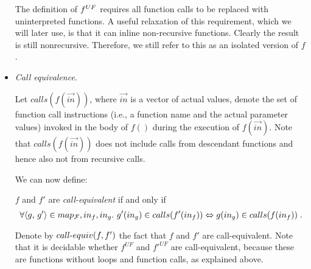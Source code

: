 \begin{itemize}
The definition of ${f}^{UF}$ requires all function calls to be replaced
with uninterpreted functions. A useful relaxation of this requirement,
which we will later use, is that it can inline non-recursive functions.
Clearly the result is still nonrecursive. Therefore, we still refer to this
as an isolated version of $f$.


\item \emph{Call equivalence}.
%
%
%
%


Let $calls(f(\vec{in}))$, where $\vec{in}$ is a vector of actual values, denote the set of function call instructions (i.e., a function name and the actual parameter values) invoked in the body of $f()$ during the execution of $f(\vec{in})$. Note that $calls(f(\vec{in}))$ does not include calls from descendant functions and hence also not from recursive calls.

We can now define:
\begin{definition}\label{def:re_func}
$f$ and $f'$ are \emph{call-equivalent} if and only if
\[ \forall \text{$\langle$$g$, $g'$$\rangle$} \in map_{\cal F}, in_f, in_g.\ g'(in_g) \in calls(f'(in_f))
\Leftrightarrow g(in_g) \in calls (f(in_f))\;. \]
\end{definition}
%
%
Denote by $call\mbox{-}equiv(f,f')$ the fact that $f$ and $f'$ are call-equivalent.
%
Note that it is decidable whether $f^{UF}$ and $f'^{UF}$ are call-equivalent, because
these are functions without loops and function calls, as explained above.

\end{itemize}

